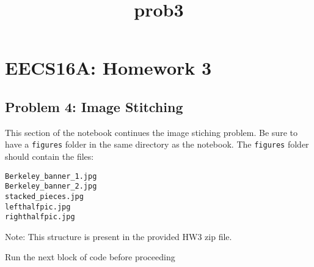 \documentclass[11pt]{article}
\title{prob3}
\begin{document}
    
    
    \maketitle
    
    

    
    \hypertarget{eecs16a-homework-3}{%
\section{EECS16A: Homework 3}\label{eecs16a-homework-3}}

    \hypertarget{problem-4-image-stitching}{%
\subsection{Problem 4: Image
Stitching}\label{problem-4-image-stitching}}

    This section of the notebook continues the image stiching problem. Be
sure to have a \texttt{figures} folder in the same directory as the
notebook. The \texttt{figures} folder should contain the files:

\begin{verbatim}
Berkeley_banner_1.jpg
Berkeley_banner_2.jpg
stacked_pieces.jpg
lefthalfpic.jpg
righthalfpic.jpg
\end{verbatim}

Note: This structure is present in the provided HW3 zip file.

    Run the next block of code before proceeding
\end{document}
